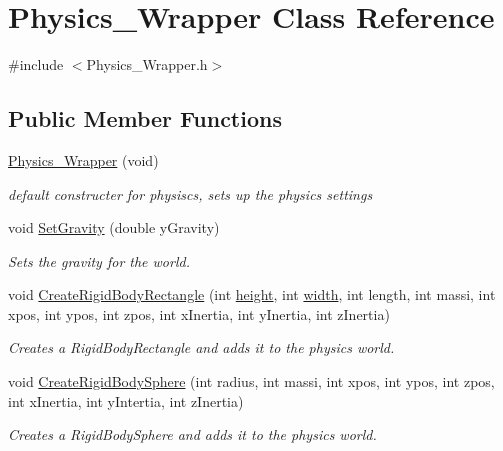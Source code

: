 \hypertarget{class_physics___wrapper}{}\section{Physics\+\_\+\+Wrapper Class Reference}
\label{class_physics___wrapper}


{\ttfamily \#include $<$Physics\+\_\+\+Wrapper.\+h$>$}

\subsection*{Public Member Functions}
\begin{DoxyCompactItemize}
\item 
\hyperlink{class_physics___wrapper_aa0b708aeb83526134e5b5436526a77f9}{Physics\+\_\+\+Wrapper} (void)
\begin{DoxyCompactList}\small\item\em default constructer for physiscs, sets up the physics settings \end{DoxyCompactList}\item 
void \hyperlink{class_physics___wrapper_a49e1a8c4ddd805f10954e441f10eb2e8}{Set\+Gravity} (double y\+Gravity)
\begin{DoxyCompactList}\small\item\em Sets the gravity for the world. \end{DoxyCompactList}\item 
void \hyperlink{class_physics___wrapper_aee5a6c0ae42b1e1aca70f60a06c7ccce}{Create\+Rigid\+Body\+Rectangle} (int \hyperlink{test_8cpp_ad12fc34ce789bce6c8a05d8a17138534}{height}, int \hyperlink{test_8cpp_a2474a5474cbff19523a51eb1de01cda4}{width}, int length, int massi, int xpos, int ypos, int zpos, int x\+Inertia, int y\+Inertia, int z\+Inertia)
\begin{DoxyCompactList}\small\item\em Creates a Rigid\+Body\+Rectangle and adds it to the physics world. \end{DoxyCompactList}\item 
void \hyperlink{class_physics___wrapper_a2621954caaa8b88e3ed3dde2032dcb5a}{Create\+Rigid\+Body\+Sphere} (int radius, int massi, int xpos, int ypos, int zpos, int x\+Inertia, int y\+Intertia, int z\+Inertia)
\begin{DoxyCompactList}\small\item\em Creates a Rigid\+Body\+Sphere and adds it to the physics world. \end{DoxyCompactList}\item 

\end{DoxyCompactItemize}
